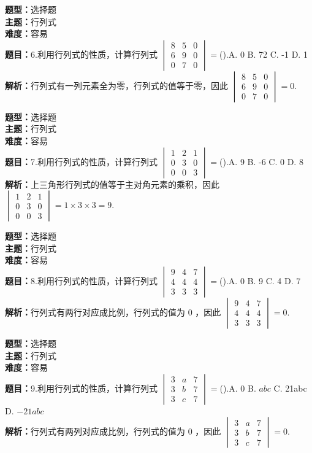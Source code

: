 \documentclass{ctexart}
\newenvironment{question}[5]{%
	\noindent\textbf{题型：}#1\\
	\textbf{主题：}#2\\
	\textbf{难度：}#3\\
	\textbf{题目：}#4\\
	\textbf{解析：}#5\\
	\vspace{1em}
}{}
\begin{document}
	\begin{question}
		{选择题}
		{行列式}
		{容易}
		{6.利用行列式的性质，计算行列式 $\begin{vmatrix}8 & 5 & 0 \\ 6 & 9 & 0 \\ 0 & 7 & 0\end{vmatrix}=$().A. 0 B. 72 C. -1 D. 1}
		{行列式有一列元素全为零，行列式的值等于零，因此 $\begin{vmatrix}8 & 5 & 0 \\ 6 & 9 & 0 \\ 0 & 7 & 0\end{vmatrix}=0$.}
	\end{question}
	
	\begin{question}
		{选择题}
		{行列式}
		{容易}
		{7.利用行列式的性质，计算行列式 $\begin{vmatrix}1 & 2 & 1 \\ 0 & 3 & 0 \\ 0 & 0 & 3\end{vmatrix}=$().A. 9 B. -6 C. 0 D. 8}
		{上三角形行列式的值等于主对角元素的乘积，因此 $\begin{vmatrix}1 & 2 & 1 \\ 0 & 3 & 0 \\ 0 & 0 & 3\end{vmatrix}=1 \times 3 \times 3=9$.}
	\end{question}
	
	\begin{question}
		{选择题}
		{行列式}
		{容易}
		{8.利用行列式的性质，计算行列式 $\begin{vmatrix}9 & 4 & 7 \\ 4 & 4 & 4 \\ 3 & 3 & 3\end{vmatrix}=$().A. 0 B. 9 C. 4 D. 7}
		{行列式有两行对应成比例，行列式的值为 0 ，因此 $\begin{vmatrix}9 & 4 & 7 \\ 4 & 4 & 4 \\ 3 & 3 & 3\end{vmatrix}=0$.}
	\end{question}
	
	\begin{question}
		{选择题}
		{行列式}
		{容易}
		{9.利用行列式的性质，计算行列式 $\begin{vmatrix}3 & a & 7 \\ 3 & b & 7 \\ 3 & c & 7\end{vmatrix}=$().A. 0 B. $abc$ C. 21abc D. $-21abc$}
		{行列式有两列对应成比例，行列式的值为 0 ，因此 $\begin{vmatrix}3 & a & 7 \\ 3 & b & 7 \\ 3 & c & 7\end{vmatrix}=0$.}
	\end{question}
	
\end{document}

